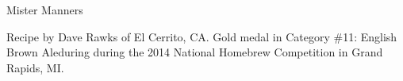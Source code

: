 \begin{recipe}{Mister Manners}

\begin{aboutblock}
Recipe by Dave Rawks of El Cerrito, CA. Gold medal in Category \#11: English Brown
Aleduring during the 2014 National Homebrew Competition in Grand Rapids, MI.
\sourceaha
\end{aboutblock}


\begin{methodandtiming}

\begin{mashsteps}
\end{mashsteps}

\begin{fermentationsteps}
\end{fermentationsteps}

\end{methodandtiming}

\recipebreak

\begin{ingredientsblock}

\begin{malts}
\end{malts}

\begin{hops}
\end{hops}


\end{ingredientsblock}

\end{recipe}
